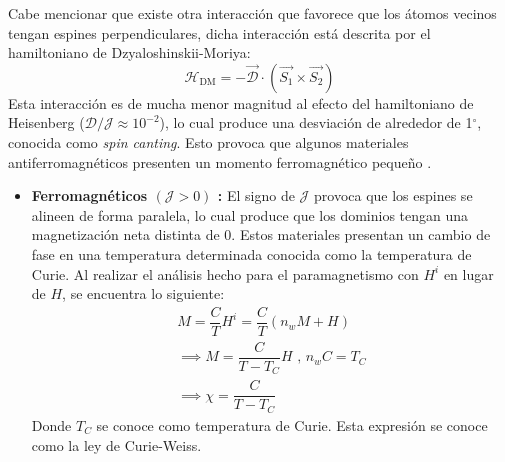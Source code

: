 \documentclass[../main.tex]{subfiles}
\begin{document}
Cabe mencionar que existe otra interacción que favorece que los átomos vecinos tengan espines perpendiculares, dicha interacción está descrita por el hamiltoniano de Dzyaloshinskii-Moriya:
\begin{equation}
    \mathcal{H}_\text{DM}=-\vec{\mathcal{D}}\cdot\left(\vec{S_1}\times\vec{S_2}\right)
    \label{eq:hamiltonianoDM}
\end{equation}
Esta interacción es de mucha menor magnitud al efecto del hamiltoniano de Heisenberg ($\mathcal{D}/\mathcal{J}\approx10^{-2}$), lo cual produce una desviación de alrededor de 1$^\circ$, conocida como \textit{spin canting}. Esto provoca que algunos materiales antiferromagnéticos presenten un momento ferromagnético pequeño \cite{coey2010magnetism} \cite{Dzyaloshinsky1958}.
\begin{itemize}
    \item \textbf{Ferromagnéticos $(\mathcal{J}>0)$ :} El signo de $\mathcal{J}$ provoca que los espines se alineen de forma paralela, lo cual produce que los dominios tengan una magnetización neta distinta de 0. Estos materiales presentan un cambio de fase en una temperatura determinada conocida como la temperatura de Curie. Al realizar el análisis hecho para el paramagnetismo con $H^i$ en lugar de $H$, se encuentra lo siguiente:
    \begin{equation}\begin{split}
        M=\dfrac{C}{T}H^i=\dfrac{C}{T}(n_wM+H)\\
        \implies M=\dfrac{C}{T-T_C}H\text{ , }n_wC=T_C\\
        \implies \chi=\dfrac{C}{T-T_C}
    \end{split}
        \label{eq:leycurieweiss}
    \end{equation}
    Donde $T_C$ se conoce como temperatura de Curie. Esta expresión se conoce como la ley de Curie-Weiss.


\end{itemize}
\end{document}
